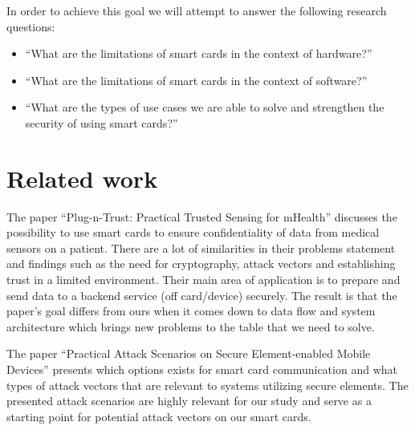 In order to achieve this goal we will attempt to answer the following research questions:
\begin{itemize}
  \item ``What are the limitations of smart cards in the context of hardware?''
  \item ``What are the limitations of smart cards in the context of software?''
  \item ``What are the types of use cases we are able to solve and strengthen the security of using smart cards?''
\end{itemize}



\section{Related work}
The paper ``Plug-n-Trust: Practical Trusted Sensing for mHealth'' \cite{plugntrust} discusses the possibility to use smart cards to ensure confidentiality of data from medical sensors on a patient. There are a lot of similarities in their problems statement and findings such as the need for cryptography, attack vectors and establishing trust in a limited environment. Their main area of application is to prepare and send data to a backend service (off card/device) securely. The result is that the paper's goal differs from ours when it comes down to data flow and system architecture which brings new problems to the table that we need to solve.

The paper ``Practical Attack Scenarios on Secure Element-enabled Mobile Devices'' \cite{practicalAttacksSE} presents which options exists for smart card communication and what types of attack vectors that are relevant to systems utilizing secure elements. The presented attack scenarios are highly relevant for our study and serve as a starting point for potential attack vectors on our smart cards.

